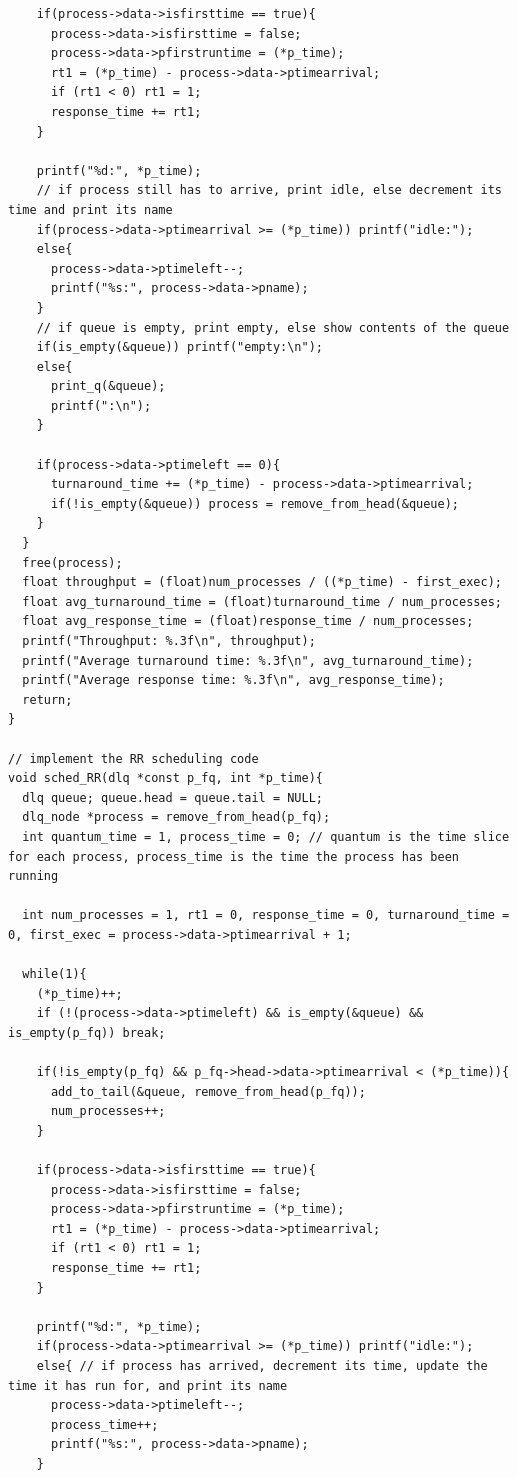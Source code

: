 \documentclass{article}
\theoremstyle{mytheoremstyle}
\theoremstyle{mytheoremstyle}
\theoremstyle{myproblemstyle}
\begin{document}
\begin{lstlisting}
    if(process->data->isfirsttime == true){
      process->data->isfirsttime = false;
      process->data->pfirstruntime = (*p_time);
      rt1 = (*p_time) - process->data->ptimearrival;
      if (rt1 < 0) rt1 = 1;
      response_time += rt1;
    }

    printf("%d:", *p_time);
    // if process still has to arrive, print idle, else decrement its time and print its name
    if(process->data->ptimearrival >= (*p_time)) printf("idle:");
    else{
      process->data->ptimeleft--;
      printf("%s:", process->data->pname);
    }
    // if queue is empty, print empty, else show contents of the queue
    if(is_empty(&queue)) printf("empty:\n");
    else{
      print_q(&queue);
      printf(":\n");
    }

    if(process->data->ptimeleft == 0){
      turnaround_time += (*p_time) - process->data->ptimearrival;
      if(!is_empty(&queue)) process = remove_from_head(&queue);
    }
  }
  free(process);
  float throughput = (float)num_processes / ((*p_time) - first_exec);
  float avg_turnaround_time = (float)turnaround_time / num_processes;
  float avg_response_time = (float)response_time / num_processes;
  printf("Throughput: %.3f\n", throughput);
  printf("Average turnaround time: %.3f\n", avg_turnaround_time);
  printf("Average response time: %.3f\n", avg_response_time);
  return;
}

// implement the RR scheduling code
void sched_RR(dlq *const p_fq, int *p_time){
  dlq queue; queue.head = queue.tail = NULL;
  dlq_node *process = remove_from_head(p_fq);
  int quantum_time = 1, process_time = 0; // quantum is the time slice for each process, process_time is the time the process has been running

  int num_processes = 1, rt1 = 0, response_time = 0, turnaround_time = 0, first_exec = process->data->ptimearrival + 1;

  while(1){
    (*p_time)++;
    if (!(process->data->ptimeleft) && is_empty(&queue) && is_empty(p_fq)) break;

    if(!is_empty(p_fq) && p_fq->head->data->ptimearrival < (*p_time)){
      add_to_tail(&queue, remove_from_head(p_fq));
      num_processes++;
    }

    if(process->data->isfirsttime == true){
      process->data->isfirsttime = false;
      process->data->pfirstruntime = (*p_time);
      rt1 = (*p_time) - process->data->ptimearrival;
      if (rt1 < 0) rt1 = 1;
      response_time += rt1;
    }

    printf("%d:", *p_time);
    if(process->data->ptimearrival >= (*p_time)) printf("idle:");
    else{ // if process has arrived, decrement its time, update the time it has run for, and print its name
      process->data->ptimeleft--;
      process_time++;
      printf("%s:", process->data->pname);
    }


\end{lstlisting}
\end{document}
